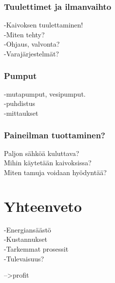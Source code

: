 \documentclass[finnish,12pt,a4paper,pdftex,elec,utf8]{aaltothesis}
\begin{document}
\subsubsection{Tuulettimet ja ilmanvaihto}
-Kaivoksen tuulettaminen!\\
-Miten tehty?\\
-Ohjaus, valvonta?\\
-Varajärjestelmät?

\subsubsection{Pumput}
-mutapumput, vesipumput.\\
-puhdistus\\
-mittaukset

\subsubsection{Paineilman tuottaminen?}
Paljon sähköä kuluttava?\\
Mihin käytetään kaivoksissa?\\
Miten tamuja voidaan hyödyntää?

\clearpage

\section{Yhteenveto}
-Energiansäästö\\
-Kustannukset\\
-Tarkemmat prosessit\\
-Tulevaisuus?

-->profit


\clearpage
\end{document}
